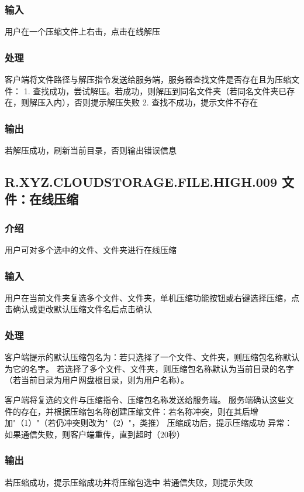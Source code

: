 \subsubsection{输入} 
用户在一个压缩文件上右击，点击在线解压

\subsubsection{处理} 
客户端将文件路径与解压指令发送给服务端，服务器查找文件是否存在且为压缩文件：
1. 查找成功，尝试解压。若成功，则解压到同名文件夹（若同名文件夹已存在，则解压入内），否则提示解压失败
2. 查找不成功，提示文件不存在


\subsubsection{输出} 
若解压成功，刷新当前目录，否则输出错误信息

\subsection{R.XYZ.CLOUDSTORAGE.FILE.HIGH.009 文件：在线压缩}

\subsubsection{介绍}
用户可对多个选中的文件、文件夹进行在线压缩
 
\subsubsection{输入} 
用户在当前文件夹复选多个文件、文件夹，单机压缩功能按钮或右键选择压缩，点击确认或更改默认压缩文件名后点击确认

\subsubsection{处理} 
客户端提示的默认压缩包名为：若只选择了一个文件、文件夹，则压缩包名称默认为它的名字。
若选择了多个文件、文件夹，则压缩包名称默认为当前目录的名字（若当前目录为用户网盘根目录，则为用户名称）。

客户端将复选的文件与压缩指令、压缩包名称发送给服务端。
服务端确认这些文件的存在，并根据压缩包名称创建压缩文件：若名称冲突，则在其后增加"（1）"（若仍冲突则改为"（2）"，类推）
压缩成功后，提示压缩成功
异常：如果通信失败，则客户端重传，直到超时（20秒）

\subsubsection{输出} 
若压缩成功，提示压缩成功并将压缩包选中
若通信失败，则提示失败

